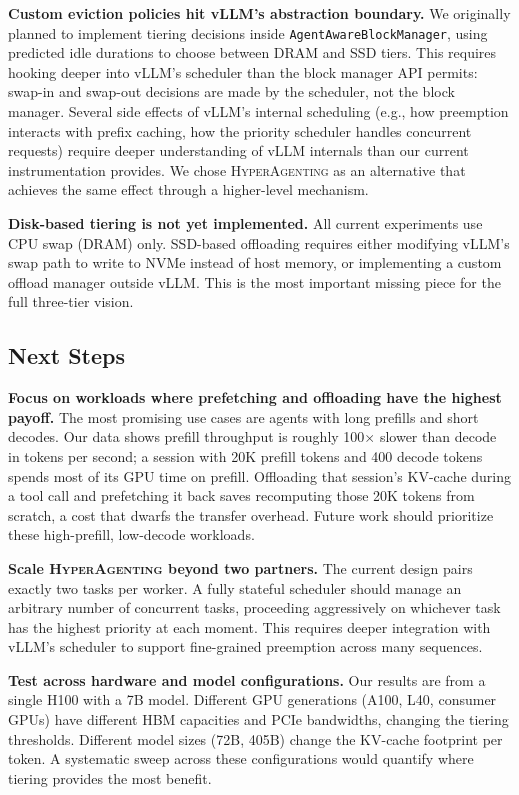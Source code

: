 \documentclass[10pt,twocolumn]{article}
\begin{document}
\textbf{Custom eviction policies hit vLLM's abstraction boundary.} We originally planned to implement tiering decisions inside \texttt{AgentAwareBlockManager}, using predicted idle durations to choose between DRAM and SSD tiers. This requires hooking deeper into vLLM's scheduler than the block manager API permits: swap-in and swap-out decisions are made by the scheduler, not the block manager. Several side effects of vLLM's internal scheduling (e.g., how preemption interacts with prefix caching, how the priority scheduler handles concurrent requests) require deeper understanding of vLLM internals than our current instrumentation provides. We chose \textsc{HyperAgenting} as an alternative that achieves the same effect through a higher-level mechanism.

\textbf{Disk-based tiering is not yet implemented.} All current experiments use CPU swap (DRAM) only. SSD-based offloading requires either modifying vLLM's swap path to write to NVMe instead of host memory, or implementing a custom offload manager outside vLLM. This is the most important missing piece for the full three-tier vision.

\subsection{Next Steps}

\textbf{Focus on workloads where prefetching and offloading have the highest payoff.} The most promising use cases are agents with long prefills and short decodes. Our data shows prefill throughput is roughly 100$\times$ slower than decode in tokens per second; a session with 20K prefill tokens and 400 decode tokens spends most of its GPU time on prefill. Offloading that session's KV-cache during a tool call and prefetching it back saves recomputing those 20K tokens from scratch, a cost that dwarfs the transfer overhead. Future work should prioritize these high-prefill, low-decode workloads.

\textbf{Scale \textsc{HyperAgenting} beyond two partners.} The current design pairs exactly two tasks per worker. A fully stateful scheduler should manage an arbitrary number of concurrent tasks, proceeding aggressively on whichever task has the highest priority at each moment. This requires deeper integration with vLLM's scheduler to support fine-grained preemption across many sequences.

\textbf{Test across hardware and model configurations.} Our results are from a single H100 with a 7B model. Different GPU generations (A100, L40, consumer GPUs) have different HBM capacities and PCIe bandwidths, changing the tiering thresholds. Different model sizes (72B, 405B) change the KV-cache footprint per token. A systematic sweep across these configurations would quantify where tiering provides the most benefit.
\end{document}
